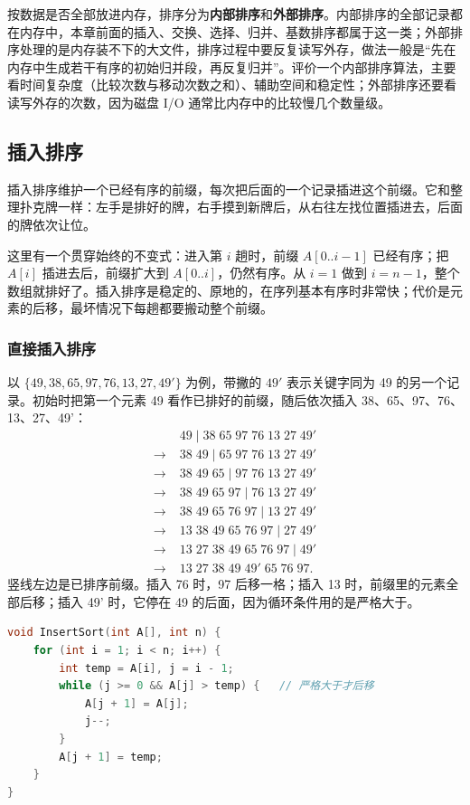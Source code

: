按数据是否全部放进内存，排序分为\textbf{内部排序}和\textbf{外部排序}。内部排序的全部记录都在内存中，本章前面的插入、交换、选择、归并、基数排序都属于这一类；外部排序处理的是内存装不下的大文件，排序过程中要反复读写外存，做法一般是“先在内存中生成若干有序的初始归并段，再反复归并”。评价一个内部排序算法，主要看时间复杂度（比较次数与移动次数之和）、辅助空间和稳定性；外部排序还要看读写外存的次数，因为磁盘 I/O 通常比内存中的比较慢几个数量级。

\subsection{插入排序}

插入排序维护一个已经有序的前缀，每次把后面的一个记录插进这个前缀。它和整理扑克牌一样：左手是排好的牌，右手摸到新牌后，从右往左找位置插进去，后面的牌依次让位。

这里有一个贯穿始终的不变式：进入第 $i$ 趟时，前缀 $A[0..i-1]$ 已经有序；把 $A[i]$ 插进去后，前缀扩大到 $A[0..i]$，仍然有序。从 $i=1$ 做到 $i=n-1$，整个数组就排好了。插入排序是稳定的、原地的，在序列基本有序时非常快；代价是元素的后移，最坏情况下每趟都要搬动整个前缀。

\subsubsection{直接插入排序}

以 $\{49,38,65,97,76,13,27,49'\}$ 为例，带撇的 $49'$ 表示关键字同为 49 的另一个记录。初始时把第一个元素 49 看作已排好的前缀，随后依次插入 38、65、97、76、13、27、49'：
\[
\begin{aligned}
&49\mid 38\;65\;97\;76\;13\;27\;49'\\
\to\;&38\;49\mid 65\;97\;76\;13\;27\;49'\\
\to\;&38\;49\;65\mid 97\;76\;13\;27\;49'\\
\to\;&38\;49\;65\;97\mid 76\;13\;27\;49'\\
\to\;&38\;49\;65\;76\;97\mid 13\;27\;49'\\
\to\;&13\;38\;49\;65\;76\;97\mid 27\;49'\\
\to\;&13\;27\;38\;49\;65\;76\;97\mid 49'\\
\to\;&13\;27\;38\;49\;49'\;65\;76\;97.
\end{aligned}
\]
竖线左边是已排序前缀。插入 76 时，97 后移一格；插入 13 时，前缀里的元素全部后移；插入 49' 时，它停在 49 的后面，因为循环条件用的是严格大于。

\begin{lstlisting}[language=C]
void InsertSort(int A[], int n) {
    for (int i = 1; i < n; i++) {
        int temp = A[i], j = i - 1;
        while (j >= 0 && A[j] > temp) {   // 严格大于才后移
            A[j + 1] = A[j];
            j--;
        }
        A[j + 1] = temp;
    }
}
\end{lstlisting}

